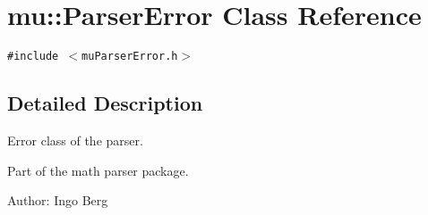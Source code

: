 \section{mu::ParserError Class Reference}
\label{classmu_1_1ParserError}
{\tt \#include $<$muParserError.h$>$}



\subsection{Detailed Description}
Error class of the parser. 

Part of the math parser package.

\begin{Desc}
\item[Author:]Ingo Berg \end{Desc}
